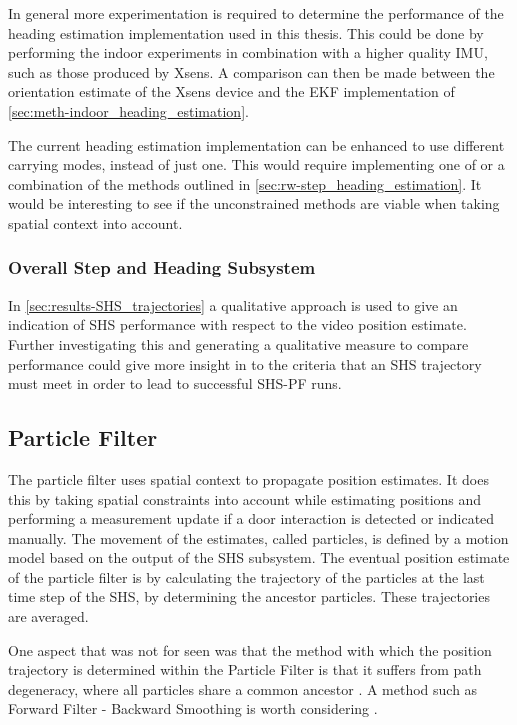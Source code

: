 In general more experimentation is required to determine the performance of the heading estimation implementation used in this thesis. This could be done by performing the indoor experiments in combination with a higher quality \ac{IMU}, such as those produced by Xsens. A comparison can then be made between the orientation estimate of the Xsens device and the EKF implementation of \cref{sec:meth-indoor_heading_estimation}.\par 

The current heading estimation implementation can be enhanced to use different carrying modes, instead of just one. This would require implementing one of or a combination of the methods outlined in \cref{sec:rw-step_heading_estimation}. It would be interesting to see if the unconstrained methods are viable when taking spatial context into account.


\subsubsection{Overall Step and Heading Subsystem }

In \cref{sec:results-SHS_trajectories} a qualitative approach is used to give an indication of SHS performance with respect to the video position estimate. Further investigating this and generating a qualitative measure to compare performance could give more insight in to the criteria that an SHS trajectory must meet in order to lead to successful SHS-PF runs.

\subsection{Particle Filter}
The particle filter uses spatial context to propagate position estimates. It does this by taking spatial constraints into account while estimating positions and performing a measurement update if a door interaction is detected or indicated manually. The movement of the estimates, called particles, is defined by a motion model based on the output of the SHS subsystem. The eventual position estimate of the particle filter is by calculating the trajectory of the particles at the last time step of the SHS, by determining the ancestor particles. These trajectories are averaged.

One aspect that was not for seen was that the method with which the position trajectory is determined within the Particle Filter is that it suffers from path degeneracy, where all particles share a common ancestor \cite{Lindsten2013}. A method such as Forward Filter - Backward Smoothing is worth considering \cite{Lindsten2013}.

